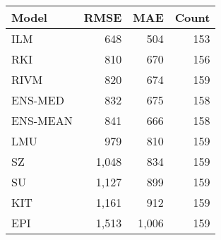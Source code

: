 \begin{tabular}{l r r r}
\toprule
Model & RMSE & MAE & Count \\
\midrule
ILM & 648 & 504 & 153 \\
RKI & 810 & 670 & 156 \\
RIVM & 820 & 674 & 159 \\
ENS-MED & 832 & 675 & 158 \\
ENS-MEAN & 841 & 666 & 158 \\
LMU & 979 & 810 & 159 \\
SZ & 1,048 & 834 & 159 \\
SU & 1,127 & 899 & 159 \\
KIT & 1,161 & 912 & 159 \\
EPI & 1,513 & 1,006 & 159 \\
\bottomrule
\end{tabular}
